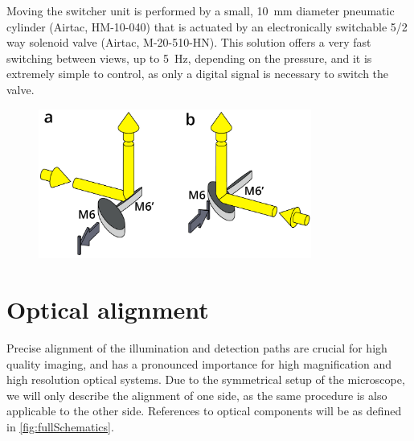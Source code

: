     Moving the switcher unit is performed by a small, \SI{10}{mm} diameter pneumatic cylinder (Airtac, HM-10-040) that is actuated by an electronically switchable 5/2 way solenoid valve (Airtac, M-20-510-HN). This solution offers a very fast switching between views, up to \SI{5}{Hz}, depending on the pressure, and it is extremely simple to control, as only a digital signal is necessary to switch the valve. 

      \label{sec:dualMirror}
      \begin{figure}[tb]
        \centering
        \includegraphics[width=0.8\textwidth]{SW/dualMirrorFigure}
        \label{fig:dualMirror}
      \end{figure}
        
      


\section{Optical alignment}
  Precise alignment of the illumination and detection paths are crucial for high quality imaging, and has a pronounced importance for high magnification and high resolution optical systems. 
  Due to the symmetrical setup of the microscope, we will only describe the alignment of one side, as the same procedure is also applicable to the other side. References to optical components will be as defined in \autoref{fig:fullSchematics}.

